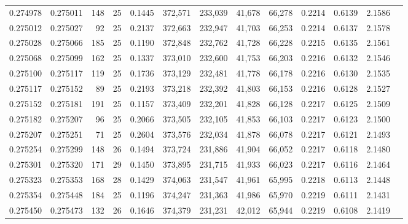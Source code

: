 \begin{tabular}{rrrrrrrrrrrrr}
0.274978 & 0.275011 &   148 &  25 &                                     0.1445 & 372,571 & 233,039 &  41,678 &  66,278 & 0.2214 & 0.6139 & 2.1586 \\
0.275012 & 0.275027 &    92 &  25 &                                     0.2137 & 372,663 & 232,947 &  41,703 &  66,253 & 0.2214 & 0.6137 & 2.1578 \\
0.275028 & 0.275066 &   185 &  25 &                                     0.1190 & 372,848 & 232,762 &  41,728 &  66,228 & 0.2215 & 0.6135 & 2.1561 \\
0.275068 & 0.275099 &   162 &  25 &                                     0.1337 & 373,010 & 232,600 &  41,753 &  66,203 & 0.2216 & 0.6132 & 2.1546 \\
0.275100 & 0.275117 &   119 &  25 &                                     0.1736 & 373,129 & 232,481 &  41,778 &  66,178 & 0.2216 & 0.6130 & 2.1535 \\
0.275117 & 0.275152 &    89 &  25 &                                     0.2193 & 373,218 & 232,392 &  41,803 &  66,153 & 0.2216 & 0.6128 & 2.1527 \\
0.275152 & 0.275181 &   191 &  25 &                                     0.1157 & 373,409 & 232,201 &  41,828 &  66,128 & 0.2217 & 0.6125 & 2.1509 \\
0.275182 & 0.275207 &    96 &  25 &                                     0.2066 & 373,505 & 232,105 &  41,853 &  66,103 & 0.2217 & 0.6123 & 2.1500 \\
0.275207 & 0.275251 &    71 &  25 &                                     0.2604 & 373,576 & 232,034 &  41,878 &  66,078 & 0.2217 & 0.6121 & 2.1493 \\
0.275254 & 0.275299 &   148 &  26 &                                     0.1494 & 373,724 & 231,886 &  41,904 &  66,052 & 0.2217 & 0.6118 & 2.1480 \\
0.275301 & 0.275320 &   171 &  29 &                                     0.1450 & 373,895 & 231,715 &  41,933 &  66,023 & 0.2217 & 0.6116 & 2.1464 \\
0.275323 & 0.275353 &   168 &  28 &                                     0.1429 & 374,063 & 231,547 &  41,961 &  65,995 & 0.2218 & 0.6113 & 2.1448 \\
0.275354 & 0.275448 &   184 &  25 &                                     0.1196 & 374,247 & 231,363 &  41,986 &  65,970 & 0.2219 & 0.6111 & 2.1431 \\
0.275450 & 0.275473 &   132 &  26 &                                     0.1646 & 374,379 & 231,231 &  42,012 &  65,944 & 0.2219 & 0.6108 & 2.1419 \\

\end{tabular}
